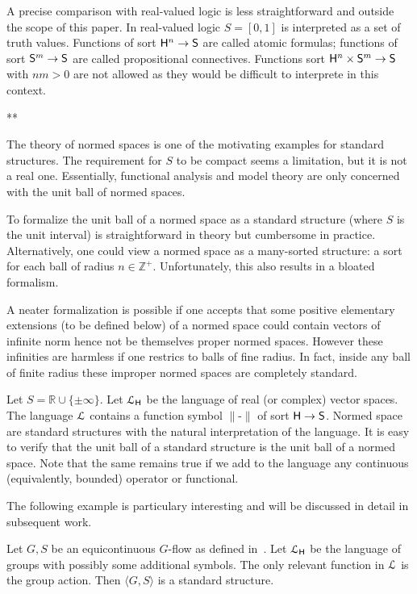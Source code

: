 \documentclass{amsproc}
\begin{document}
A precise comparison with real-valued logic is less straightforward and outside the scope of this paper.
In real-valued logic $S=[0,1]$ is interpreted as a set of truth values.
Functions of sort ${\sf H}^n\to {\sf S}$ are called atomic formulas; functions of sort ${\sf S}^m\to {\sf S}$ are called propositional connectives.
Functions sort ${\sf H}^n\times{\sf S}^m\to {\sf S}$ with $nm>0$ are not allowed as they would be difficult to interprete in this context.

\hfil***

The theory of normed spaces is one of the motivating examples for standard structures.
The requirement for $S$ to be compact seems a limitation, but it is not a real one.
Essentially, functional analysis and model theory are only concerned with the unit ball of normed spaces.

To formalize the unit ball of a normed space as a standard structure (where $S$ is the unit interval) is straightforward in theory but cumbersome in practice.
Alternatively, one could view a normed space as a many-sorted structure: a sort for each ball of radius $n\in\mathds{Z}^+$.
Unfortunately, this also results in a bloated formalism.

A neater formalization is possible if one accepts that some positive elementary extensions (to be defined below) of a normed space could contain vectors of infinite norm hence not be themselves proper normed spaces.
However these infinities are harmless if one restrics to balls of fine radius.
In fact, inside any ball of finite radius these improper normed spaces are completely standard.

\begin{example}\label{ex_normed_spaces}
Let $S=\mathds{R}\cup\{\pm\infty\}$.
Let ${\EuScript L}_{\sf H}$ be the language of real (or complex) vector spaces.
The language ${\EuScript L}$ contains a function symbol $\|\mbox{-}\|$ of sort ${\sf H}\to {\sf S}$.
Normed space are standard structures with the natural interpretation of the language.
It is easy to verify that the unit ball of a standard structure is the unit ball of a normed space.
Note that the same remains true if we add to the language any continuous (equivalently, bounded) operator or functional.
\end{example}

The following example is particulary interesting and will be discussed in detail in subsequent work.

\begin{example}
  Let $G,S$ be an equicontinuous $G$-flow as defined in~\cite{A}.
  Let ${\EuScript L}_{\sf H}$ be the language of groups with possibly some additional symbols.
  The only relevant function in ${\EuScript L}$ is the group action.
  Then $\langle G,S\rangle$ is a standard structure.
\end{example}
\end{document}
